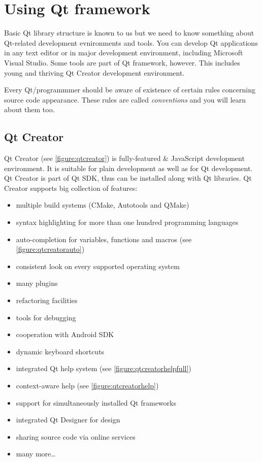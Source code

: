 \chapter{Using Qt framework}
Basic Qt library structure is known to us but we need to know something about Qt-related development evnironments and tools. You can develop Qt applications in any text editor or in major development environment, including Microsoft Visual Studio. Some tools are part of Qt framework, however. This includes young and thriving Qt Creator development environment.

Every Qt/\cpp programmmer should be aware of existence of certain rules concerning source code appearance. These rules are called \textit{conventions} and you will learn about them too.

\section{Qt Creator}
Qt Creator (see \autoref{figure:qtcreator}) is fully-featured \cpp \& JavaScript development environment. It is suitable for plain \cpp development as well as for Qt development. Qt Creator is part of Qt SDK, thus can be installed along with Qt libraries. Qt Creator supports big collection of features:
\begin{itemize}
\item multiple build systems (CMake, Autotools and QMake)
\item syntax highlighting for more than one hundred programming languages
\item auto-completion for variables, functions and macros (see \autoref{figure:qtcreatorauto})
\item consistent look on every supported operating system
\item many plugins
\item refactoring facilities
\item tools for debugging
\item cooperation with Android SDK
\item dynamic keyboard shortcuts
\item integrated Qt help system (see \autoref{figure:qtcreatorhelpfull})
\item context-aware help (see \autoref{figure:qtcreatorhelp})
\item support for simultaneously installed Qt frameworks
\item integrated Qt Designer for  design
\item sharing source code via online services
\item many more\ldots
\end{itemize}

